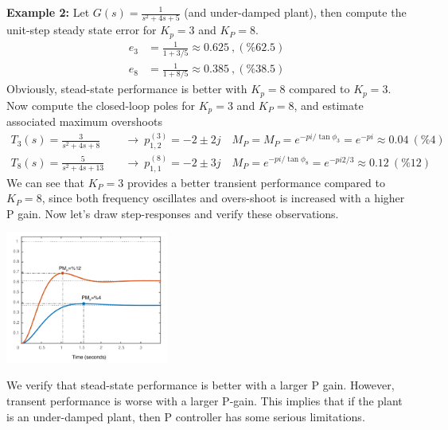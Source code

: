\documentclass[twoside]{article}
\begin{document}
\textbf{Example 2:} Let $G(s) = \frac{1}{s^2 + 4 s + 5}$ (and under-damped
plant), then compute the unit-step steady state error for $K_p = 3$ and $K_P = 8$.
%
\begin{align*}
  e_{3} &= \frac{1}{1 + 3 / 5} \approx 0.625 \ , (\%62.5) 
\\
  e_{8} &= \frac{1}{1 + 8 / 5} \approx 0.385 \ , (\%38.5) 
\end{align*}
%
Obviously, stead-state performance is better with $K_p = 8$
compared to $K_p = 3$. Now compute the closed-loop poles
for $K_p = 3$ and $K_P = 8$, and estimate associated 
maximum overshoots
%
\begin{align*}
  T_3(s) = \frac{3}{s^2 + 4 s + 8} &\quad \rightarrow \
  p^{(3)}_{1,2} = -2 \pm 2 j  \quad M_P =M_P = e^{-pi / \tan \phi_3} =
                                     e^{-pi} \approx 0.04 \ (\%4)
\\
  T_8(s) = \frac{5}{s^2 + 4 s + 13} &\quad \rightarrow \
  p^{(8)}_{1,1} = -2 \pm 3 j  \quad M_P = e^{-pi / \tan \phi_8} =
                                      e^{-pi 2 / 3} \approx 0.12  \ (\%12)
\end{align*}
%
We can see that $K_P = 3$ provides a better transient performance
compared to $K_P = 8$, since both frequency oscillates and overs-shoot
is increased with a higher P gain. Now let's draw step-responses and
verify these observations. 

\vspace{12 pt}

  \begin{minipage}[h]{1\linewidth}
    \begin{center}
      \includegraphics[width=0.4\textwidth]{Pcont2}
    \end{center}
  \end{minipage}

\vspace{12 pt}

We verify that stead-state performance is better with a larger
P gain. However, transent performance is worse with a
larger P-gain. This implies that if the plant is an under-damped
plant, then P controller has some serious limitations. 
\end{document}

